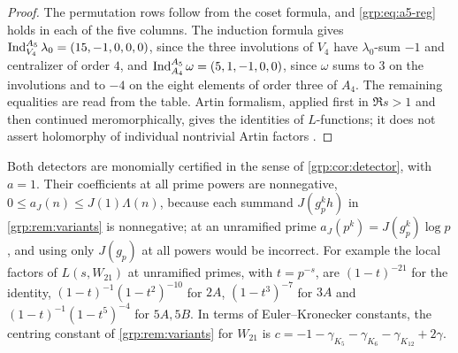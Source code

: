 
\begin{proof}
The permutation rows follow from the coset formula, and
\eqref{grp:eq:a5-reg} holds in each of the five columns. The induction formula
gives $\operatorname{Ind}_{V_4}^{A_5}\lambda_0=(15,-1,0,0,0)$, since the three involutions
of $V_4$ have $\lambda_0$-sum $-1$ and centralizer of order $4$, and
$\operatorname{Ind}_{A_4}^{A_5}\omega=(5,1,-1,0,0)$, since $\omega$ sums to $3$ on the
involutions and to $-4$ on the eight elements of order three of $A_4$. The
remaining equalities are read from the table. Artin formalism, applied first
in $\Re s>1$ and then continued meromorphically, gives the identities of
$L$-functions; it does not assert holomorphy of individual nontrivial Artin
factors \cite{GunHazraSahu2025Holomorphy,LemkeOliverThornerZaman2024Approximate}.
\end{proof}

Both detectors are monomially certified in the sense of
\cref{grp:cor:detector}, with $a=1$. Their coefficients at all prime powers
are nonnegative, $0\le a_J(n)\le J(1)\Lambda(n)$, because each summand
$J(g_p^kh)$ in \cref{grp:rem:variants} is nonnegative; at an unramified prime
$a_J(p^k)=J(g_p^k)\log p$, and using only $J(g_p)$ at all powers would be
incorrect. For example the local factors of $L(s,W_{21})$ at unramified
primes, with $t=p^{-s}$, are $(1-t)^{-21}$ for the identity,
$(1-t)^{-1}(1-t^2)^{-10}$ for $2A$, $(1-t^3)^{-7}$ for $3A$ and
$(1-t)^{-1}(1-t^5)^{-4}$ for $5A,5B$. In terms of Euler--Kronecker constants,
the centring constant of \cref{grp:rem:variants} for $W_{21}$ is
$c=-1-\gamma_{K_5}-\gamma_{K_6}-\gamma_{K_{12}}+2\gamma$.

